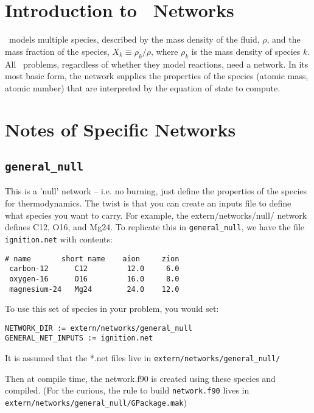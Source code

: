 \section{Introduction to \maestro\ Networks}

\maestro\ models multiple species, described by the mass density of
the fluid, $\rho$, and the mass fraction of the species, $X_k \equiv
\rho_k/\rho$, where $\rho_k$ is the mass density of species $k$.  All
\maestro\ problems, regardless of whether they model reactions, need a
network.  In its most basic form, the network supplies the properties
of the species (atomic mass, atomic number) that are interpreted by
the equation of state to compute.

\section{Notes of Specific Networks}

\subsection{{\tt general\_null}}

This is a 'null' network -- i.e. no burning, just define the
properties of the species for thermodynamics.  The twist is that you
can create an inputs file to define what species you want to carry.
For example, the extern/networks/null/ network defines C12, O16, and
Mg24.  To replicate this in {\tt general\_null}, we have the file
{\tt ignition.net} with contents:

\begin{verbatim}
# name       short name    aion     zion
 carbon-12      C12         12.0     6.0
 oxygen-16      O16         16.0     8.0
 magnesium-24   Mg24        24.0    12.0
\end{verbatim}

To use this set of species in your problem, you would set:

\begin{verbatim}
NETWORK_DIR := extern/networks/general_null
GENERAL_NET_INPUTS := ignition.net
\end{verbatim}

It is assumed that the *.net files live in {\tt extern/networks/general\_null/}

Then at compile time, the network.f90 is created using these species and
compiled.  (For the curious, the rule to build {\tt network.f90} lives in
{\tt extern/networks/general\_null/GPackage.mak})

